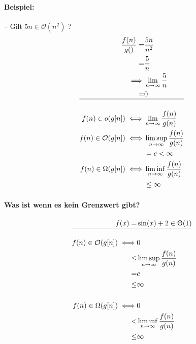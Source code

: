 \documentclass[a4paper]{scrartcl}
\begin{document}
			\paragraph{Beispiel:}
			-- Gilt \(5n \in \mathcal{O} (n^2) \) ?
			\begin{align*}
				\frac{f(n)}{g()} =& \frac{5n}{n^2}\\ 
				=& \frac{5}{n}\\
				\implies& \lim\limits_{n \rightarrow \infty} \frac{5}{n}\\
				=& 0\\\hline
				\\
				f(n) \in o(g[n]) \iff& \lim\limits_{n \rightarrow \infty} \frac{f(n)}{g(n)}\\
				f(n) \in \mathcal{O}(g[n]) \iff& \limsup \limits_{n \rightarrow \infty} \frac{f(n)}{g(n)}\\ 
				& = c <\infty\\
				f(n) \in \Omega(g[n]) \iff& \liminf \limits_{n \rightarrow \infty} \frac{f(n)}{g(n)}\\
				&\leq \infty\\
			\end{align*}
			
			\paragraph{Was ist wenn es kein Grenzwert gibt?}
			\begin{align*}
				f(x) =& \sin(x) + 2 \in \Theta (1) \\\hline
				\\
				f(n) \in \mathcal{O}(g[n]) \iff& 0\\
				 \leq& \limsup \limits_{n \rightarrow \infty} \frac{f(n)}{g(n)}\\
				 =& c\\ 
				 \leq& \infty\\ 
				 \\
				 f(n) \in \Omega (g[n]) \iff& 0\\
				 <& \liminf \limits_{n \rightarrow \infty} \frac{f(n)}{g(n)}\\
				 \leq& \infty\\ 
			\end{align*}
			
			
\end{document}
